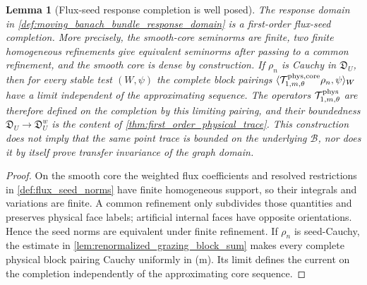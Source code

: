 \documentclass[11pt]{amsart}
\theoremstyle{compactplain}
\newtheorem*{lemma*}{Lemma}
\theoremstyle{compactdefinition}
\theoremstyle{compactremark}
\newcommand{\Bcal}{\mathcal B}
\begin{document}
\begin{lemma*}[Flux-seed response completion is well posed]
The response domain in \cref{def:moving_banach_bundle_response_domain} is a
first-order flux-seed completion.  More precisely, the smooth-core seminorms
are finite, two finite homogeneous
refinements give equivalent seminorms after passing to a common refinement, and
the smooth core is dense by construction.  If \(\rho_n\) is Cauchy in
\(\mathfrak D_U\), then for every stable test \((W,\psi)\) the complete block
pairings
\(\langle \mathcal T_{1,m,\theta}^{\rm phys,core}\rho_n,\psi\rangle_W\)
have a limit independent of the approximating sequence.  The operators
\(\mathcal T_{1,m,\theta}^{\rm phys}\) are therefore defined on the completion
by this limiting pairing, and their boundedness
\(\mathfrak D_U\to\mathfrak D_U^w\) is the content of
\cref{thm:first_order_physical_trace}.  This construction does not imply
that the same point trace is bounded on the underlying \(\Bcal\), nor does it
by itself prove transfer invariance of the graph domain.
\end{lemma*}

\begin{proof}
On the smooth core the weighted flux coefficients and resolved restrictions in
\cref{def:flux_seed_norms} have finite homogeneous support, so their integrals
and variations are finite.  A common refinement only subdivides those
quantities and preserves physical face labels; artificial internal faces have
opposite orientations.  Hence the seed norms are equivalent under finite
refinement.  If \(\rho_n\) is seed-Cauchy, the estimate in
\cref{lem:renormalized_grazing_block_sum} makes every complete physical block
pairing Cauchy uniformly in (m).  Its limit defines the current on the
completion independently of the approximating core sequence.
\end{proof}
\end{document}
